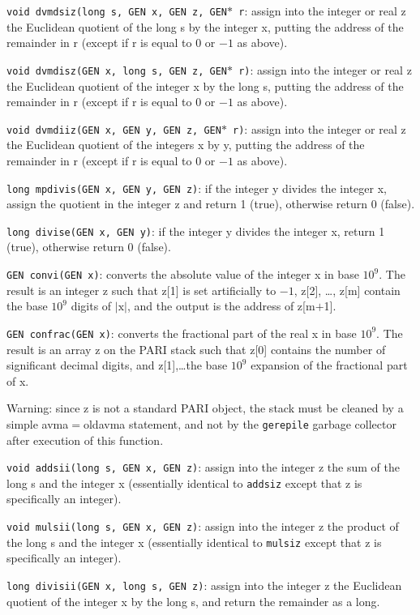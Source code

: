{\tt void dvmdsiz(long s, GEN x, GEN z, GEN$*$ r}: assign into the integer or
real z the Euclidean quotient of the long s by the integer x, putting the
address of the remainder in r (except if r is equal to 0 or $-1$ as above).

{\tt void dvmdisz(GEN x, long s, GEN z, GEN$*$ r)}: assign into the integer or
real z the Euclidean quotient of the integer x by the long s, putting the
address of the remainder in r (except if r is equal to 0 or $-1$ as above).

{\tt void dvmdiiz(GEN x, GEN y, GEN z, GEN$*$ r)}: assign into the integer or
real z the Euclidean quotient of the integers x by y, putting the address of 
the remainder in r (except if r is equal to 0 or $-1$ as above).


{\tt long mpdivis(GEN x, GEN y, GEN z)}: if the integer y divides the integer
x, assign the quotient in the integer z and return 1 (true), otherwise return
0 (false).

{\tt long divise(GEN x, GEN y)}: if the integer y divides the integer x, return
1 (true), otherwise return 0 (false).

{\tt GEN convi(GEN x)}: converts the absolute value of the integer x in base
$10^9$. The result is an integer z such that z[1] is set artificially to 
$-1$, z[2], \dots, z[m] contain the base $10^9$ digits of $|\text{x}|$, and
the output is the address of z[m$+$1].

{\tt GEN confrac(GEN x)}: converts the fractional part of the real x in base
$10^9$. The result is an array z on the PARI stack such that z[0] contains
the number of significant decimal digits, and z[1],\dots the base $10^9$
expansion of the fractional part of x.

Warning: since z is not a standard PARI object, the stack must be cleaned by
a simple avma$=$oldavma statement, and not by the {\tt gerepile} garbage
collector after execution of this function.

{\tt void addsii(long s, GEN x, GEN z)}: assign into the integer z the sum of
the long s and the integer x (essentially identical to {\tt addsiz} except
that z is specifically an integer).

{\tt void mulsii(long s, GEN x, GEN z)}: assign into the integer z the product
of the long s and the integer x (essentially identical to {\tt mulsiz} except
that z is specifically an integer).

{\tt long divisii(GEN x, long s, GEN z)}: assign into the integer z the 
Euclidean quotient of the integer x by the long s, and return the remainder
as a long.

